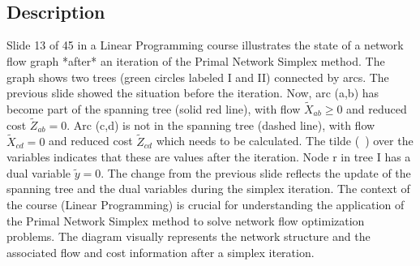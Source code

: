 \documentclass{article}%
\begin{document}
\underline{} \\
\underline{} \\
%
\subsection{Description}%
Slide 13 of 45 in a Linear Programming course illustrates the state of a network flow graph *after* an iteration of the Primal Network Simplex method.  The graph shows two trees (green circles labeled I and II) connected by arcs.  The previous slide showed the situation before the iteration.  Now, arc (a,b) has become part of the spanning tree (solid red line), with flow $\tilde{X}_{ab} \ge 0$ and reduced cost $\tilde{Z}_{ab} = 0$.  Arc (c,d) is not in the spanning tree (dashed line), with flow $\tilde{X}_{cd} = 0$ and reduced cost $\tilde{Z}_{cd}$ which needs to be calculated. The tilde (~) over the variables indicates that these are values after the iteration.  Node r in tree I has a dual variable $\tilde{y} = 0$. The change from the previous slide reflects the update of the spanning tree and the dual variables during the simplex iteration. The context of the course (Linear Programming) is crucial for understanding the application of the Primal Network Simplex method to solve network flow optimization problems. The diagram visually represents the network structure and the associated flow and cost information after a simplex iteration.%
\end{document}
